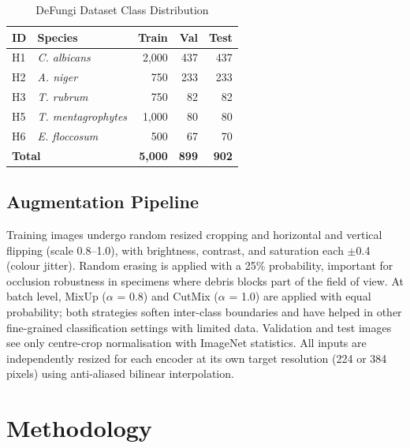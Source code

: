 \documentclass[conference]{IEEEtran}
\begin{document}
\begin{table}[!t]
  \caption{DeFungi Dataset Class Distribution}
  \label{tab:dataset}
  \centering
  \footnotesize\setlength{\tabcolsep}{4pt}
  \begin{tabular}{llrrr}
    \toprule
    \textbf{ID} & \textbf{Species} & \textbf{Train} & \textbf{Val} & \textbf{Test}\\
    \midrule
    H1 & \textit{C. albicans}        & 2{,}000 & 437 & 437 \\
    H2 & \textit{A. niger}           &   750   & 233 & 233 \\
    H3 & \textit{T. rubrum}          &   750   &  82 &  82 \\
    H5 & \textit{T. mentagrophytes}  & 1{,}000 &  80 &  80 \\
    H6 & \textit{E. floccosum}       &   500   &  67 &  70 \\
    \midrule
    \multicolumn{2}{l}{\textbf{Total}} & \textbf{5{,}000} & \textbf{899} & \textbf{902}\\
    \bottomrule
  \end{tabular}
\end{table}

\subsection{Augmentation Pipeline}

Training images undergo random resized cropping and horizontal and vertical
flipping (scale 0.8--1.0), with brightness, contrast, and saturation each
$\pm$0.4 (colour jitter). Random erasing \cite{zhong2020} is applied with a
25\% probability, important for occlusion robustness in specimens where debris
blocks part of the field of view. At batch level, MixUp \cite{zhang2018}
($\alpha$ = 0.8) and CutMix \cite{yun2019} ($\alpha$ = 1.0) are applied with
equal probability; both strategies soften inter-class boundaries and have
helped in other fine-grained classification settings with limited data.
Validation and test images see only centre-crop normalisation with ImageNet
statistics. All inputs are independently resized for each encoder at its own
target resolution (224 or 384 pixels) using anti-aliased bilinear
interpolation.

\vspace{-2pt}
\section{Methodology}
\end{document}
